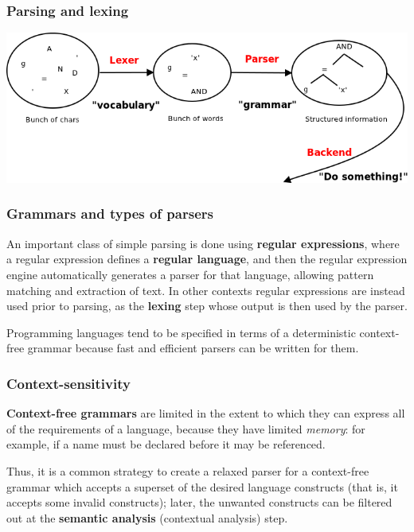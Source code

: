 \documentclass{beamer}
\begin{document}
\begin{frame}
  \frametitle{Parsing and lexing}
  \begin{center}
    \includegraphics[scale=0.4]{lexer_parser}
  \end{center}
\end{frame}

\begin{frame}
  \frametitle{Grammars and types of parsers}

  An important class of simple parsing is done using \textbf{regular
  expressions}, where a regular expression defines a \textbf{regular language},
  and then the regular expression engine automatically generates a parser for
  that language, allowing pattern matching and extraction of text. In other
  contexts regular expressions are instead used prior to parsing, as the
  \textbf{lexing} step whose output is then used by the parser.

  \vfill

  Programming languages tend to be specified in terms of a deterministic
  context-free grammar because fast and efficient parsers can be written for
  them.
\end{frame}

\begin{frame}
  \frametitle{Context-sensitivity}

  \textbf{Context-free grammars} are limited in the extent to which they can
  express all of the requirements of a language, because they have limited
  \textit{memory}: for example, if a name must be declared before it may be
  referenced.

  \vfill

  Thus, it is a common strategy to create a relaxed parser for a context-free
  grammar which accepts a superset of the desired language constructs (that is,
  it accepts some invalid constructs); later, the unwanted constructs can be
  filtered out at the \textbf{semantic analysis} (contextual analysis) step.
\end{frame}
\end{document}
